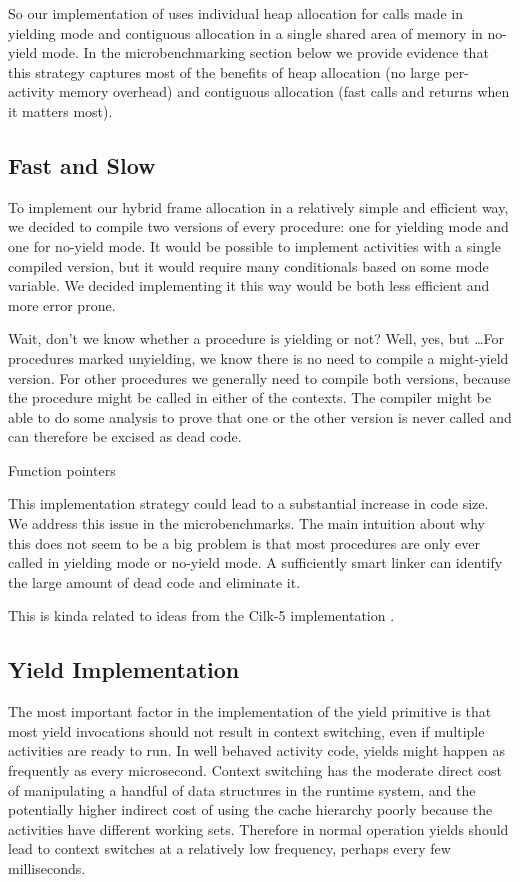 \documentclass[10pt,preprint]{sigplanconf}
\begin{document}
So our implementation of \charcoal{} uses individual heap allocation for calls made in yielding mode and contiguous allocation in a single shared area of memory in no-yield mode.
In the microbenchmarking section below we provide evidence that this strategy captures most of the benefits of heap allocation (no large per-activity memory overhead) and contiguous allocation (fast calls and returns when it matters most).

\subsection{Fast and Slow}

To implement our hybrid frame allocation in a relatively simple and efficient way, we decided to compile two versions of every procedure: one for yielding mode and one for no-yield mode.
It would be possible to implement activities with a single compiled version, but it would require many conditionals based on some mode variable.
We decided implementing it this way would be both less efficient and more error prone.


Wait, don't we know whether a procedure is yielding or not?  Well, yes,
but \ldots For procedures marked unyielding, we know there is no need to
compile a might-yield version.  For other procedures we generally need
to compile both versions, because the procedure might be called in
either of the contexts.  The compiler might be able to do some analysis
to prove that one or the other version is never called and can therefore
be excised as dead code.

Function pointers

This implementation strategy could lead to a substantial increase in code size.
We address this issue in the microbenchmarks.
The main intuition about why this does not seem to be a big problem is that most procedures are only ever called in yielding mode or no-yield mode.
A sufficiently smart linker can identify the large amount of dead code and eliminate it.

This is kinda related to ideas from the Cilk-5 implementation
\cite{Frigo1998}.

\subsection{Yield Implementation}

The most important factor in the implementation of the yield primitive is that most yield invocations should not result in context switching, even if multiple activities are ready to run.
In well behaved activity code, yields might happen as frequently as every microsecond.
Context switching has the moderate direct cost of manipulating a handful of data structures in the runtime system, and the potentially higher indirect cost of using the cache hierarchy poorly because the activities have different working sets.
Therefore in normal operation yields should lead to context switches at a relatively low frequency, perhaps every few milliseconds.
\end{document}
